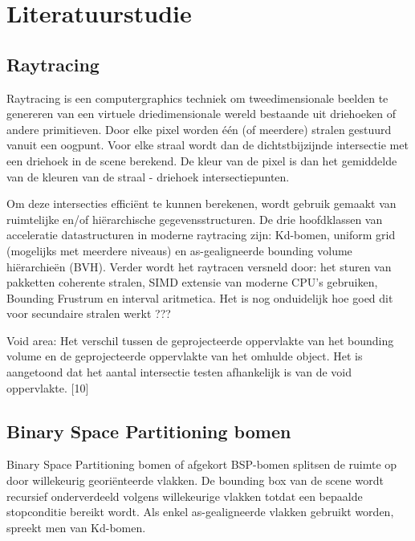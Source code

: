 \chapter{Literatuurstudie}
\label{hoofdstuk:literature}

\section{Raytracing}
Raytracing is een computergraphics techniek om tweedimensionale beelden te genereren van een virtuele driedimensionale wereld bestaande uit driehoeken of andere primitieven.
Door elke pixel worden één (of meerdere) stralen gestuurd vanuit een oogpunt.
Voor elke straal wordt dan de dichtstbijzijnde intersectie met een driehoek in de scene berekend.
De kleur van de pixel is dan het gemiddelde van de kleuren van de straal - driehoek intersectiepunten.

Om deze intersecties efficiënt te kunnen berekenen, wordt gebruik gemaakt van ruimtelijke en/of hiërarchische gegevensstructuren.
De drie hoofdklassen van acceleratie datastructuren in moderne raytracing zijn: Kd-bomen, uniform grid (mogelijks met meerdere niveaus) en as-gealigneerde bounding volume hiërarchieën (BVH). 
Verder wordt het raytracen versneld door: het sturen van pakketten coherente stralen, SIMD extensie van moderne CPU's gebruiken, Bounding Frustrum en interval aritmetica.
Het is nog onduidelijk hoe goed dit voor secundaire stralen werkt ???

Void area: Het verschil tussen de geprojecteerde oppervlakte van het bounding volume en de geprojecteerde oppervlakte van het omhulde object.
Het is aangetoond dat het aantal intersectie testen afhankelijk is van de void oppervlakte. [10]

\section{Binary Space Partitioning bomen}
Binary Space Partitioning bomen of afgekort BSP-bomen splitsen de ruimte op door willekeurig georiënteerde vlakken.
De bounding box van de scene wordt recursief onderverdeeld volgens willekeurige vlakken totdat een bepaalde stopconditie bereikt wordt.
Als enkel as-gealigneerde vlakken gebruikt worden, spreekt men van Kd-bomen.


